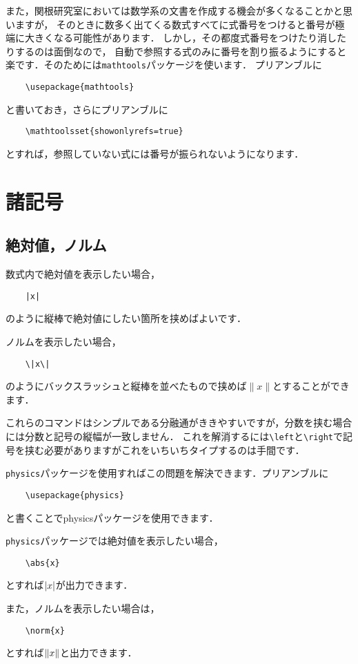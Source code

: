 \documentclass[a4paper, 11pt, uplatex]{jsreport}
\numberwithin{equation}{section}
\theoremstyle{definition}
\begin{document}
また，関根研究室においては数学系の文書を作成する機会が多くなることかと思いますが，
そのときに数多く出てくる数式すべてに式番号をつけると番号が極端に大きくなる可能性があります．
しかし，その都度式番号をつけたり消したりするのは面倒なので，
自動で参照する式のみに番号を割り振るようにすると楽です．そのためには\verb|mathtools|パッケージを使います．
プリアンブルに
\begin{verbatim}
    \usepackage{mathtools}
\end{verbatim}
と書いておき，さらにプリアンブルに
\begin{verbatim}
    \mathtoolsset{showonlyrefs=true}
\end{verbatim}
とすれば，参照していない式には番号が振られないようになります\cite{FomulaNumber}．


\section{諸記号}

\subsection{絶対値，ノルム}

数式内で絶対値を表示したい場合，
\begin{verbatim}
    |x|
\end{verbatim}
のように縦棒で絶対値にしたい箇所を挟めばよいです．

ノルムを表示したい場合，
\begin{verbatim}
    \|x\|
\end{verbatim}
のようにバックスラッシュと縦棒を並べたもので挟めば$\|x\|$とすることができます．

これらのコマンドはシンプルである分融通がききやすいですが，分数を挟む場合には分数と記号の縦幅が一致しません．
これを解消するには\verb|\left|と\verb|\right|で記号を挟む必要がありますがこれをいちいちタイプするのは手間です．

\verb|physics|パッケージを使用すればこの問題を解決できます．プリアンブルに
\begin{verbatim}
    \usepackage{physics}
\end{verbatim}
と書くことでphysicsパッケージを使用できます．

\verb|physics|パッケージでは絶対値を表示したい場合，
\begin{verbatim}
    \abs{x}
\end{verbatim}
とすれば$\abs{x}$が出力できます．

また，ノルムを表示したい場合は，
\begin{verbatim}
    \norm{x}
\end{verbatim}
とすれば$\norm{x}$と出力できます．
\end{document}
